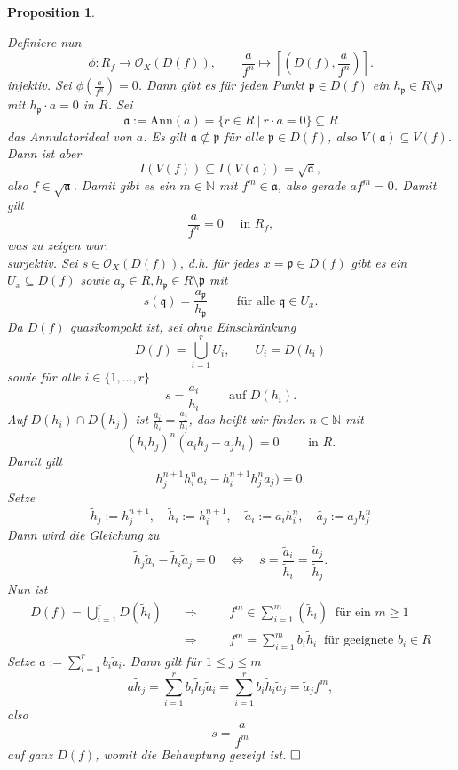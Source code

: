 \documentclass[11pt]{book}
\newtheorem{proposition}[theorem]{Proposition}
\theoremstyle{nonumberbreak}
\newenvironment{pr}[1][]{\ifthenelse{\equal{#1}{}}{\proof}{\proof[#1]}\rm}{\endproof}
\newcommand{\p}{\mathfrak{p}}
\newcommand{\q}{\mathfrak{q}}
\newcommand{\ideal}{\subseteq}
\begin{document}
\begin{spacing}{1.4}
\begin{proposition}
\begin{pr}
\begin{compactenum}
\item Definiere nun 
$$\phi: R_f \longrightarrow \mathcal{O}_X\left( D(f)\right), \qquad \frac{a}{f^n} \mapsto \left[ \left(D(f), \frac{a}{f^n} \right) \right].$$
\textit{injektiv.} Sei $\phi\left( \frac{a}{f^n}\right) =0$. Dann gibt es für jeden Punkt $\p \in D(f)$ ein $h_{\p} \in R \setminus \p$ mit $h_{\p} \cdot a = 0$ in $R$. Sei 
$$\mathfrak{a}:= \textrm{Ann}(a) = \{ r \in R \ \vert \ r \cdot a = 0 \} \ideal R$$
das Annulatorideal von $a$. Es gilt $\mathfrak{a} \nsubset \p$ für alle $\p \in D(f)$, also $V(\mathfrak{a}) \subseteq V(f)$.  Dann ist aber 
$$I(V(f)) \subseteq I(V(\mathfrak{a})) = \sqrt{\mathfrak{a}},$$
also $f \in \sqrt{\mathfrak{a}}$. Damit gibt es ein $m \in \mathbb{N}$ mit $f^m \in \mathfrak{a}$, also gerade $a f^m =0$. Damit gilt $$\frac{a}{f^n} = 0 \quad \textrm{ in } R_f,$$
was zu zeigen war.\\
\textit{surjektiv.}
 Sei $s \in \mathcal{O}_X\left(D(f)\right)$, d.h. für jedes $x= \p \in D(f)$ gibt es ein $U_x \subseteq D(f)$ sowie $a_{\p} \in R, h_{\p} \in R \setminus \p$ mit
 $$s(\q) = \frac{a_{\p}}{h_{\p}} \qquad \textrm{ für alle } \q \in U_x.$$
Da $D(f)$ quasikompakt ist, sei ohne Einschränkung 
$$D(f) = \bigcup_{i=1}^r U_i, \qquad U_i = D(h_i)$$
sowie für alle $i \in \{1, \ldots, r\}$
$$s= \frac{a_i}{h_i} \qquad \textrm{ auf } D(h_i).$$
Auf $D(h_i) \cap D(h_j)$ ist $\frac{a_i}{h_i} = \frac{a_j}{h_j}$, das heißt wir finden $n \in \mathbb{N}$ mit
$$(h_i h_j)^n \left( a_ih_j - a_j h_i \right) = 0 \qquad \textrm{ in } R.$$
Damit gilt
$$h_j^{n+1} h_i^n a_i - h_i^{n+1}h_j^n a_j ) =0.$$
Setze
$$\tilde{h}_j := h_j^{n+1}, \quad \tilde{h}_i := h_i^{n+1}, \quad \tilde{a}_i := a_i h_i^n, \quad \tilde{a_j} := a_j h_j^n$$
Dann wird die Gleichung zu 
$$\tilde{h}_j \tilde{a}_i - \tilde{h}_i \tilde{a}_j = 0 \quad \Longleftrightarrow \quad s = \frac{\tilde{a}_i}{\tilde{h}_i} = \frac{\tilde{a}_j}{\tilde{h}_j}.$$
Nun ist
\setlength{\abovedisplayskip}{5.5pt}
\setlength{\belowdisplayskip}{5.5pt}
\begin{alignat*}{5}
D(f) = \bigcup_{i=1}^r D(\tilde{h}_i) \quad &\Longrightarrow && \quad f^m \in \sum_{i=1}^m ( \tilde{h}_i ) \ \textrm{ für ein } m \geqslant 1 \\
& \Longrightarrow && \quad f^m = \sum_{i=1}^m b_i \tilde{h}_i \ \textrm{ für geeignete } b_i \in R
\end{alignat*}
Setze $a:= \sum_{i=1}^r b_i \tilde{a}_i$. Dann gilt für $1 \leqslant j \leqslant m$
$$a \tilde{h}_j = \sum_{i=1}^r b_i \tilde{h}_j \tilde{a}_i = \sum_{i=1}^r b_i \tilde{h}_i \tilde{a}_j = \tilde{a}_j f^m,$$
also $$s= \frac{a}{f^m}$$
auf ganz $D(f)$, womit die Behauptung gezeigt ist. $\hfill \Box$
\end{compactenum}


\end{pr}
\end{proposition}
\end{spacing}
\end{document}
